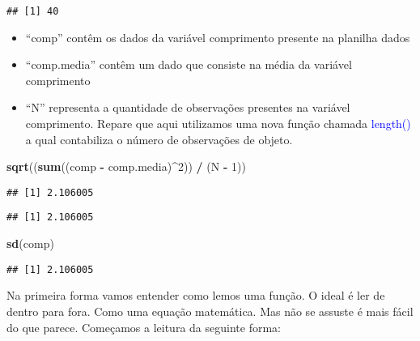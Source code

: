 \documentclass[titlepage, oneside, openany, a4paper]{book}
\newenvironment{Shaded}{\begin{snugshade}}{\end{snugshade}}
\newcommand{\DecValTok}[1]{\textcolor[rgb]{0.00,0.00,0.81}{#1}}
\newcommand{\KeywordTok}[1]{\textcolor[rgb]{0.13,0.29,0.53}{\textbf{#1}}}
\newcommand{\NormalTok}[1]{#1}
\newcommand{\OperatorTok}[1]{\textcolor[rgb]{0.81,0.36,0.00}{\textbf{#1}}}
\newcommand{\StringTok}[1]{\textcolor[rgb]{0.31,0.60,0.02}{#1}}
\providecommand{\tightlist}{%
  \setlength{\itemsep}{0pt}\setlength{\parskip}{0pt}}
\begin{document}
\begin{verbatim}
## [1] 40
\end{verbatim}

\begin{itemize}
\tightlist
\item
  ``comp'' contêm os dados da variável comprimento presente na planilha dados
\item
  ``comp.media'' contêm um dado que consiste na média da variável comprimento
\item
  ``N'' representa a quantidade de observações presentes na variável comprimento. Repare que aqui utilizamos uma nova função chamada \textcolor{blue}{length()} a qual contabiliza o número de observações de objeto.
\end{itemize}

\begin{Shaded}
\begin{Highlighting}[]
\KeywordTok{sqrt}\NormalTok{((}\KeywordTok{sum}\NormalTok{((comp }\OperatorTok{-}\StringTok{ }\NormalTok{comp.media)}\OperatorTok{^}\DecValTok{2}\NormalTok{)) }\OperatorTok{/}\StringTok{ }\NormalTok{(N }\OperatorTok{-}\StringTok{ }\DecValTok{1}\NormalTok{))}
\end{Highlighting}
\end{Shaded}

\begin{verbatim}
## [1] 2.106005
\end{verbatim}

\begin{Shaded}
\end{Shaded}

\begin{verbatim}
## [1] 2.106005
\end{verbatim}

\begin{Shaded}
\begin{Highlighting}[]
\KeywordTok{sd}\NormalTok{(comp)}
\end{Highlighting}
\end{Shaded}

\begin{verbatim}
## [1] 2.106005
\end{verbatim}

Na primeira forma vamos entender como lemos uma função. O ideal é ler de dentro para fora. Como uma equação matemática. Mas não se assuste é mais fácil do que parece. Começamos a leitura da seguinte forma:
\end{document}
